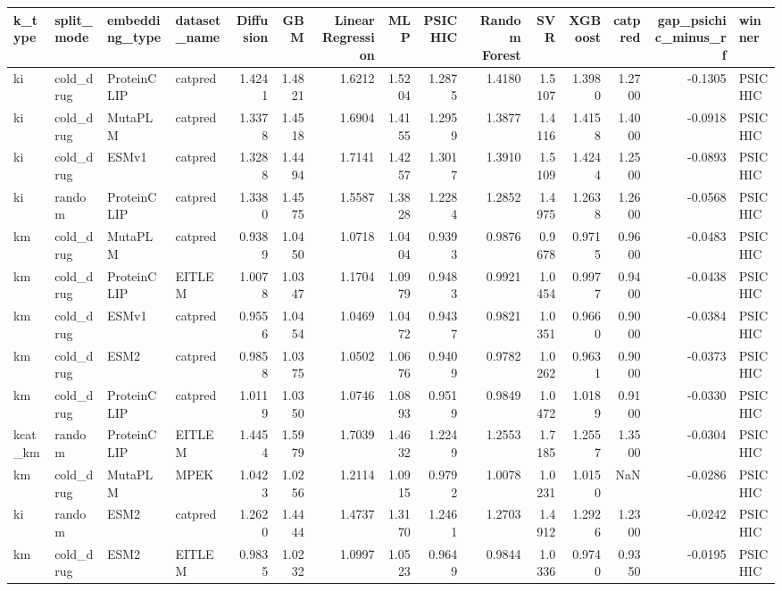 \begin{tabular}{llllrrrrrrrrrrl}
\toprule
k_type & split_mode & embedding_type & dataset_name & Diffusion & GBM & Linear Regression & MLP & PSICHIC & Random Forest & SVR & XGBoost & catpred & gap_psichic_minus_rf & winner \\
\midrule
ki & cold_drug & ProteinCLIP & catpred & 1.4241 & 1.4821 & 1.6212 & 1.5204 & 1.2875 & 1.4180 & 1.5107 & 1.3980 & 1.2700 & -0.1305 & PSICHIC \\
ki & cold_drug & MutaPLM & catpred & 1.3378 & 1.4518 & 1.6904 & 1.4155 & 1.2959 & 1.3877 & 1.4116 & 1.4158 & 1.4000 & -0.0918 & PSICHIC \\
ki & cold_drug & ESMv1 & catpred & 1.3288 & 1.4494 & 1.7141 & 1.4257 & 1.3017 & 1.3910 & 1.5109 & 1.4244 & 1.2500 & -0.0893 & PSICHIC \\
ki & random & ProteinCLIP & catpred & 1.3380 & 1.4575 & 1.5587 & 1.3828 & 1.2284 & 1.2852 & 1.4975 & 1.2638 & 1.2600 & -0.0568 & PSICHIC \\
km & cold_drug & MutaPLM & catpred & 0.9389 & 1.0450 & 1.0718 & 1.0404 & 0.9393 & 0.9876 & 0.9678 & 0.9715 & 0.9600 & -0.0483 & PSICHIC \\
km & cold_drug & ProteinCLIP & EITLEM & 1.0078 & 1.0347 & 1.1704 & 1.0979 & 0.9483 & 0.9921 & 1.0454 & 0.9977 & 0.9400 & -0.0438 & PSICHIC \\
km & cold_drug & ESMv1 & catpred & 0.9556 & 1.0454 & 1.0469 & 1.0472 & 0.9437 & 0.9821 & 1.0351 & 0.9660 & 0.9000 & -0.0384 & PSICHIC \\
km & cold_drug & ESM2 & catpred & 0.9858 & 1.0375 & 1.0502 & 1.0676 & 0.9409 & 0.9782 & 1.0262 & 0.9631 & 0.9000 & -0.0373 & PSICHIC \\
km & cold_drug & ProteinCLIP & catpred & 1.0119 & 1.0350 & 1.0746 & 1.0893 & 0.9519 & 0.9849 & 1.0472 & 1.0189 & 0.9100 & -0.0330 & PSICHIC \\
kcat_km & random & ProteinCLIP & EITLEM & 1.4454 & 1.5979 & 1.7039 & 1.4632 & 1.2249 & 1.2553 & 1.7185 & 1.2557 & 1.3500 & -0.0304 & PSICHIC \\
km & cold_drug & MutaPLM & MPEK & 1.0423 & 1.0256 & 1.2114 & 1.0915 & 0.9792 & 1.0078 & 1.0231 & 1.0150 & NaN & -0.0286 & PSICHIC \\
ki & random & ESM2 & catpred & 1.2620 & 1.4444 & 1.4737 & 1.3170 & 1.2461 & 1.2703 & 1.4912 & 1.2926 & 1.2300 & -0.0242 & PSICHIC \\
km & cold_drug & ESM2 & EITLEM & 0.9835 & 1.0232 & 1.0997 & 1.0523 & 0.9649 & 0.9844 & 1.0336 & 0.9740 & 0.9350 & -0.0195 & PSICHIC \\

\end{tabular}
